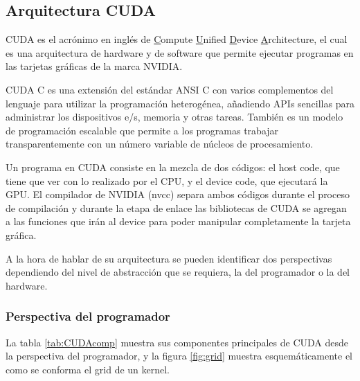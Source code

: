     \subsection{Arquitectura CUDA}
    CUDA es el acrónimo en inglés de \underline{C}ompute \underline{U}nified \underline{D}evice \underline{A}rchitecture, el cual es una arquitectura de hardware y de software que permite ejecutar programas en las tarjetas gráficas de la marca NVIDIA\cite{CUDAP}.
    \newline
   
    CUDA C es una extensión del estándar ANSI C con varios complementos del lenguaje para utilizar la programación heterogénea, añadiendo APIs sencillas para administrar los dispositivos e/s, memoria y otras tareas. También es un modelo de programación escalable que permite a los programas trabajar transparentemente con un número variable de núcleos de procesamiento.
    \newline
    
    Un programa en CUDA consiste en la mezcla de dos códigos: el host code, que tiene que ver con lo realizado por el CPU, y el device code, que ejecutará la GPU. El compilador de NVIDIA (nvcc) separa ambos códigos durante el proceso de compilación y durante la etapa de enlace las bibliotecas de CUDA se agregan a las funciones que irán al device para poder manipular completamente la tarjeta gráfica.
    \newline
    
    A la hora de hablar de su arquitectura se pueden identificar dos perspectivas dependiendo del nivel de abstracción que se requiera, la del programador o la del hardware.
        
  \subsubsection{Perspectiva del programador}
   
    La tabla \ref{tab:CUDAcomp} muestra sus componentes principales de CUDA desde la perspectiva del programador, y la figura \ref{fig:grid} muestra esquemáticamente el como se conforma el grid de un kernel.
    
